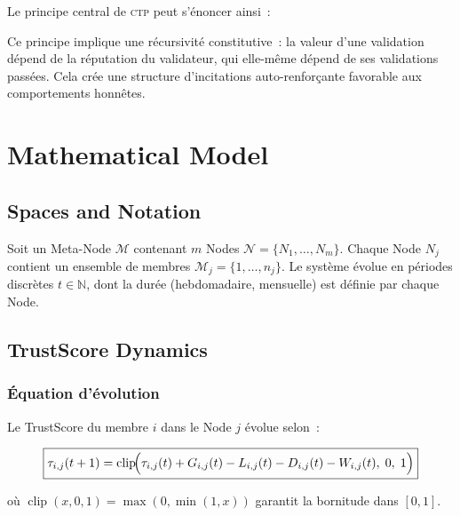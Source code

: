 \documentclass[12pt,a4paper]{article}
\theoremstyle{definition}
\theoremstyle{plain}
\theoremstyle{remark}
\newcommand{\CTP}{\textsc{ctp}}
\newcommand{\trustscore}{\tau}
\newcommand{\N}{\mathbb{N}}
\newcommand{\1}{\mathbf{1}}
\newcommand{\clip}{\operatorname{clip}}
\begin{document}
Le principe central de \CTP{} peut s'énoncer ainsi~:

\begin{center}
\end{center}

Ce principe implique une récursivité constitutive~: la valeur d'une validation
dépend de la réputation du validateur, qui elle-même dépend de ses validations
passées. Cela crée une structure d'incitations auto-renforçante favorable aux
comportements honnêtes.

\section{Mathematical Model}
\label{sec:modele}

\subsection{Spaces and Notation}

Soit un Meta-Node $\mathcal{M}$ contenant $m$ Nodes $\mathcal{N} = \{N_1,
\ldots, N_m\}$. Chaque Node $N_j$ contient un ensemble de membres
$\mathcal{M}_j = \{1, \ldots, n_j\}$. Le système évolue en périodes discrètes
$t \in \N$, dont la durée (hebdomadaire, mensuelle) est définie par chaque
Node.

\subsection{TrustScore Dynamics}

\subsubsection{Équation d'évolution}

Le TrustScore du membre $i$ dans le Node $j$ évolue selon~:

\begin{equation}
\boxed{
\trustscore_{i,j}(t+1) = \clip\!\Bigl(
  \trustscore_{i,j}(t) + G_{i,j}(t) - L_{i,j}(t) - D_{i,j}(t) - W_{i,j}(t),\;
  0,\; 1
\Bigr)
}
\label{eq:trust}
\end{equation}

où $\clip(x, 0, 1) = \max(0, \min(1, x))$ garantit la bornitude dans $[0,1]$.
\end{document}
